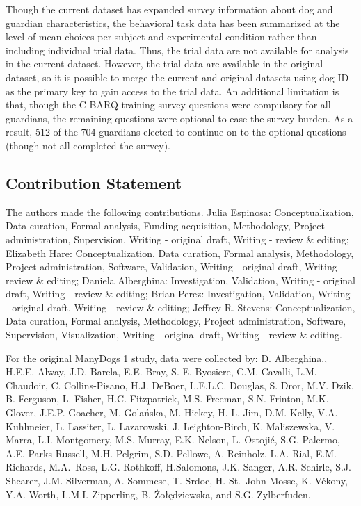 \documentclass[
  pub,floatsintext]{apa6}
\begin{document}
Though the current dataset has expanded survey information about dog and guardian characteristics, the behavioral task data has been summarized at the level of mean choices per subject and experimental condition rather than including individual trial data. Thus, the trial data are not available for analysis in the current dataset. However, the trial data are available in the original dataset, so it is possible to merge the current and original datasets using dog ID as the primary key to gain access to the trial data. An additional limitation is that, though the C-BARQ training survey questions were compulsory for all guardians, the remaining questions were optional to ease the survey burden. As a result, 512 of the 704 guardians elected to continue on to the optional questions (though not all completed the survey).

\hypertarget{contribution-statement}{%
\subsection{Contribution Statement}\label{contribution-statement}}

The authors made the following contributions. Julia Espinosa: Conceptualization, Data curation, Formal analysis, Funding acquisition, Methodology, Project administration, Supervision, Writing - original draft, Writing - review \& editing; Elizabeth Hare: Conceptualization, Data curation, Formal analysis, Methodology, Project administration, Software, Validation, Writing - original draft, Writing - review \& editing; Daniela Alberghina: Investigation, Validation, Writing - original draft, Writing - review \& editing; Brian Perez: Investigation, Validation, Writing - original draft, Writing - review \& editing; Jeffrey R. Stevens: Conceptualization, Data curation, Formal analysis, Methodology, Project administration, Software, Supervision, Visualization, Writing - original draft, Writing - review \& editing.

For the original ManyDogs 1 study, data were collected by: D. Alberghina., H.E.E. Alway, J.D. Barela, E.E. Bray, S.-E. Byosiere, C.M. Cavalli, L.M. Chaudoir, C. Collins-Pisano, H.J. DeBoer, L.E.L.C. Douglas, S. Dror, M.V. Dzik, B. Ferguson, L. Fisher, H.C. Fitzpatrick, M.S. Freeman, S.N. Frinton, M.K. Glover, J.E.P. Goacher, M. Golańska, M.
Hickey, H.-L. Jim, D.M. Kelly, V.A. Kuhlmeier, L. Lassiter, L. Lazarowski, J. Leighton-Birch, K. Maliszewska, V. Marra, L.I. Montgomery, M.S. Murray, E.K. Nelson, L. Ostojić, S.G. Palermo, A.E. Parks Russell, M.H. Pelgrim, S.D. Pellowe, A. Reinholz, L.A. Rial, E.M. Richards, M.A.~Ross, L.G. Rothkoff, H.Salomons, J.K. Sanger, A.R. Schirle, S.J. Shearer, J.M. Silverman, A. Sommese, T. Srdoc, H. St.~John-Mosse, K. Vékony, Y.A. Worth, L.M.I. Zipperling, B. Żołędziewska, and S.G. Zylberfuden.
\end{document}
